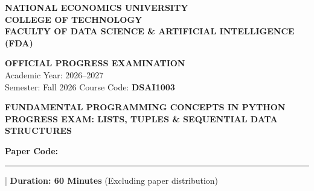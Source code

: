 \documentclass[11pt,a4paper]{article}
\begin{document}

\noindent
\begin{minipage}[t]{0.64\textwidth}
  \raggedright\small
  \textbf{NATIONAL ECONOMICS UNIVERSITY}\\
  \textbf{COLLEGE OF TECHNOLOGY}\\
  \textbf{FACULTY OF DATA SCIENCE \& ARTIFICIAL INTELLIGENCE (FDA)}
\end{minipage}%
\hfill
\begin{minipage}[t]{0.34\textwidth}
  \raggedleft\footnotesize
  \textbf{OFFICIAL PROGRESS EXAMINATION}\\
  Academic Year: 2026--2027\\
  Semester: Fall 2026 \quad Course Code: \textbf{DSAI1003}
\end{minipage}

\vspace{0.15em}

\begin{center}
  {\Large\bfseries\color{primaryblue} FUNDAMENTAL PROGRAMMING CONCEPTS IN PYTHON}\\[0.08em]
  {\normalsize\bfseries PROGRESS EXAM: LISTS, TUPLES \& SEQUENTIAL DATA STRUCTURES}\\[0.08em]
  {\normalsize\textbf{Paper Code:} \rule{1.6cm}{0.4pt} \quad | \quad \textbf{Duration: 60 Minutes} (Excluding paper distribution)}
\end{center}

\vspace{0.05em}
\end{document}
